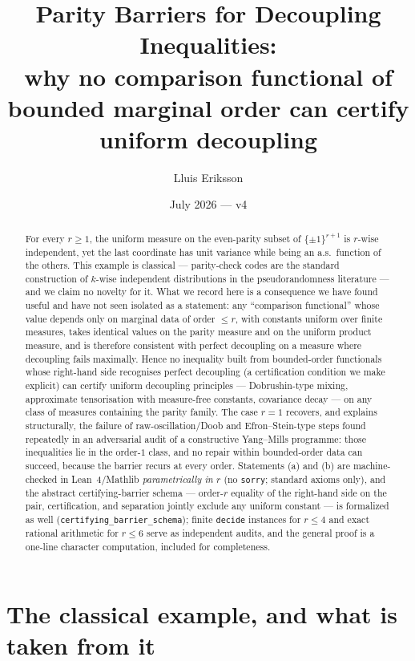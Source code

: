 \documentclass[11pt]{article}
\title{Parity Barriers for Decoupling Inequalities:\\
\large why no comparison functional of bounded marginal order can
certify uniform decoupling}
\author{Lluis Eriksson}
\date{July 2026 --- v4}
\theoremstyle{remark}
\begin{document}
\maketitle

\begin{abstract}
For every $r\ge1$, the uniform measure on the even-parity subset of
$\{\pm1\}^{r+1}$ is $r$-wise independent, yet the last coordinate has
unit variance while being an a.s.\ function of the others. This
example is classical --- parity-check codes are the standard
construction of $k$-wise independent distributions in the
pseudorandomness literature \cite{Joffe, ABI, AGM, AlonSpencer} ---
and we claim no novelty for it. What we record here is a consequence
we have found useful and have not seen isolated as a statement: any
``comparison functional'' whose value depends only on marginal data
of order $\le r$, with constants uniform over finite measures, takes
identical values on the parity measure and on the uniform product
measure, and is therefore consistent with perfect decoupling on a
measure where decoupling fails maximally. Hence no inequality built from bounded-order functionals whose
right-hand side recognises perfect decoupling (a certification
condition we make explicit) can certify uniform decoupling
principles --- Dobrushin-type mixing, approximate tensorisation with
measure-free constants, covariance decay --- on any class of measures
containing the parity family. The case $r=1$ recovers, and explains
structurally, the failure of raw-oscillation/Doob and
Efron--Stein-type steps found repeatedly in an adversarial audit of a
constructive Yang--Mills programme: those inequalities lie in the
order-$1$ class, and no repair within bounded-order data can succeed,
because the barrier recurs at every order. Statements (a) and (b) are machine-checked in Lean~4/Mathlib
\emph{parametrically in $r$} (no \texttt{sorry}; standard axioms
only), and the abstract certifying-barrier schema --- order-$r$
equality of the right-hand side on the pair, certification, and
separation jointly exclude any uniform constant --- is formalized as
well (\texttt{certifying\_barrier\_schema}); finite \texttt{decide}
instances for $r\le4$ and exact rational arithmetic for $r\le6$
serve as independent audits, and the general proof is a one-line
character computation, included for completeness.
\end{abstract}

\section{The classical example, and what is taken from it}
\end{document}
